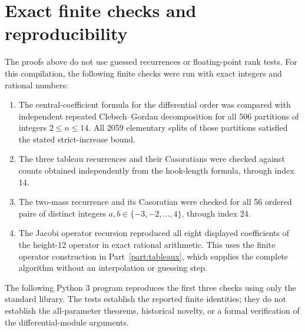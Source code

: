 \documentclass[11pt,a4paper]{article}
\theoremstyle{definition}
\theoremstyle{remark}
\numberwithin{equation}{section}
\begin{document}
\section{Exact finite checks and reproducibility}\label{app:verification}
The proofs above do not use guessed recurrences or floating-point rank tests.
For this compilation, the following finite checks were run with exact integers
and rational numbers:
\begin{enumerate}
\item The central-coefficient formula for the differential order was compared
with independent repeated Clebsch--Gordan decomposition for all 506 partitions
of integers $2\le n\le14$. All 2059 elementary splits of those partitions
satisfied the stated strict-increase bound.
\item The three tableau recurrences and their Casoratians were checked against
counts obtained independently from the hook-length formula, through index 14.
\item The two-mass recurrence and its Casoratian were checked for all 56 ordered
pairs of distinct integers $a,b\in\{-3,-2,\ldots,4\}$, through index 24.
\item The Jacobi operator recursion reproduced all eight displayed coefficients
of the height-12 operator in exact rational arithmetic. This uses the finite
operator construction in Part~\ref{part:tableaux}, which supplies the complete
algorithm without an interpolation or guessing step.
\end{enumerate}
The following Python 3 program reproduces the first three checks using only
the standard library. The tests establish the reported finite identities;
they do not establish the all-parameter theorems, historical novelty, or a
formal verification of the differential-module arguments.
\end{document}
